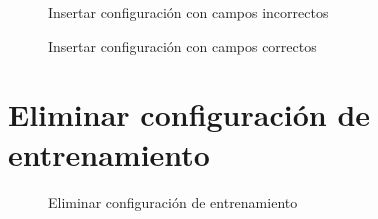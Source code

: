 {\begin{figure}[H]
\centering
 \caption{Insertar configuración con campos incorrectos}
 \label{fig:ci} 
\end{figure}

\begin{figure}[H]
\centering
 \caption{Insertar configuración con campos correctos}
 \label{fig:cc} 
\end{figure}

\section{Eliminar configuración de entrenamiento}
\begin{figure}[H]
\centering
 \caption{Eliminar configuración de entrenamiento}
 \label{fig:ce} 
\end{figure}

}
